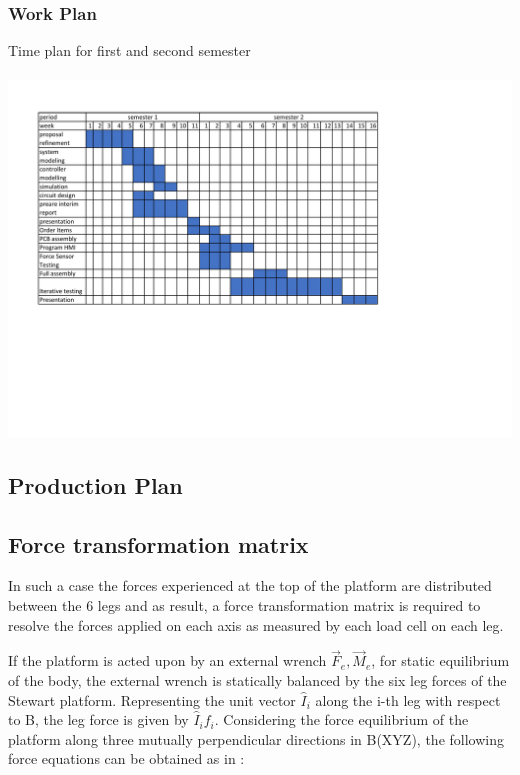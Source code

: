 \subsubsection{Work Plan}
\begin{center}
	\begin{table}[H]
		\centering
		\caption[Time plan]{Time plan for first and second semester}
		\paragraph{ }
		\includegraphics[width=0.95\linewidth]{Figures/workplan}
	\end{table}
\end{center}
\clearpage
\subsection{Production Plan}


\clearpage

\subsection{Force transformation matrix}
In such a case the forces experienced at the top of the platform are distributed between the 6 legs and as result, a force transformation matrix is required to resolve the forces applied on each axis as measured by each load cell on each leg.

If the platform is acted upon by an external wrench {$\vec{F}_e, \vec{M}_e$}, for static equilibrium of the body, the external wrench is statically balanced by the six leg forces of the Stewart platform. Representing the unit vector $\hat{I}_i$ along the i-th leg with respect to B, the leg force is given  by $\hat{I}_if_i$. Considering the force equilibrium of the platform along  three mutually perpendicular directions in B(XYZ), the following force equations can be obtained as in \cite{dwarakanath_design_2001}:

